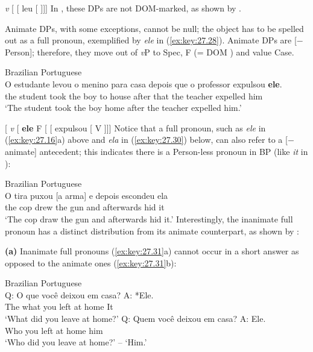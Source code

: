 \documentclass[output=paper]{langsci/langscibook}
\begin{document}
\ea\label{ex:key:27.27}
    \emph{v} [ [ leu [    ]]]
    \vspace{2em}
\z
In , these DPs are not DOM-marked, as shown by
\textcite{Rodriguez-Mondonedo2007}.

Animate DPs, with some exceptions, cannot be null; the object has to be spelled
out as a full pronoun, exemplified by \emph{ele} in (\ref{ex:key:27.28}).
Animate DPs are [$-$Person]; therefore, they move out of \emph{v}P to Spec,
F\tss{[Person]} (= DOM ){} and value Case.

\ea\label{ex:key:27.28} Brazilian Portuguese\\
    \gll O   estudante levou   o     menino para  casa     depois  que o professor  expulsou \textbf{ele}.\\
         the student     took   the  boy       to       house   after     that the teacher    expelled him\\
    \glt `The student took the boy home after the teacher expelled him.'
\z

\ea\label{ex:key:27.29}
    {}[ \emph{v} [ \textbf{ele\tss{[$-$Person]}}
    F\tss{[Person]}\tss{} [ [ expulsou [ V  ]]]
\z
Notice that a full pronoun, such as \emph{ele} in (\ref{ex:key:27.16}a) above
and \emph{ela} in (\ref{ex:key:27.30}) below, can also refer to a [$-$animate]
antecedent; this indicates there is a Person-less pronoun in \gls{BP} (like
\emph{it} in ):

\ea\label{ex:key:27.30} Brazilian Portuguese\\
    \gll O     tira   puxou [a arma] e depois escondeu \underline{\hphantom{ela}} ela\\
          the  cop  drew    the   gun      and afterwards hid {} it\\
    \glt `The cop draw the gun and afterwards hid it.'
\z
Interestingly, the inanimate full pronoun has a distinct distribution from its
animate counterpart, as shown by \citet{Galves2001}:

\noindent\textbf{(a)} Inanimate full pronouns (\ref{ex:key:27.31}a) cannot occur
in a short answer as opposed to the animate ones (\ref{ex:key:27.31}b):

\ea\label{ex:key:27.31} Brazilian Portuguese\\
    \ea
        \gll Q:  O     que     você   deixou  em   casa?         A: *Ele.\\
        {}     The what   you     left    at      home {} \hphantom{*}It\\
        \glt \hphantom{Q: }`What did you leave at home?'
    \ex
        \gll Q:  Quem   você   deixou  em   casa?              A: Ele.\\
            {} Who     you     left       at     home          {} him\\
        \glt \hphantom{Q: }`Who did you leave at home?' -- `Him.'
    \z
\z
\end{document}
